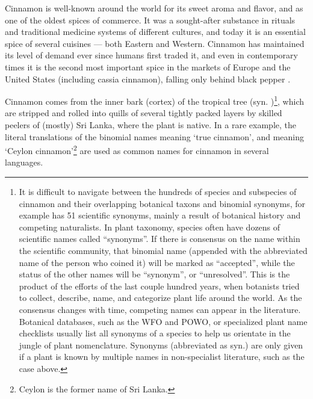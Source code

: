 \noindent Cinnamon is well-known around the world for its sweet aroma and flavor, and as one of the oldest spices of commerce. It was a sought-after substance in rituals and traditional medicine systems of different cultures, and today it is an essential spice of several cuisines --- both Eastern and Western. Cinnamon has maintained its level of demand ever since humans first traded it, and even in contemporary times it is the second most important spice in the markets of Europe and the United States (including cassia cinnamon), falling only behind black pepper \parencite[]{ravindran_cinnamon_2004}.

Cinnamon comes from the inner bark (cortex) of the tropical tree  (syn. )\footnote{It is difficult to navigate between the hundreds of species and subspecies of cinnamon and their overlapping botanical taxons and binomial synonyms,  for example has 51 scientific synonyms, mainly a result of botanical history and competing naturalists. In plant taxonomy, species often have dozens of scientific names called ``synonyms''. If there is consensus on the name within the scientific community, that binomial name (appended with the abbreviated name of the person who coined it) will be marked as ``accepted'', while the status of the other names will be ``synonym'', or ``unresolved''. This is the product of the efforts of the last couple hundred years, when botanists tried to collect, describe, name, and categorize plant life around the world. As the consensus changes with time, competing names can appear in the literature. Botanical databases, such as the \gls{WFO} and \gls{POWO}, or specialized plant name checklists usually list all synonyms of a species to help us orientate in the jungle of plant nomenclature. Synonyms (abbreviated as syn.) are only given if a plant is known by multiple names in non-specialist literature, such as the case above.}, which are stripped and rolled into quills of several tightly packed layers by skilled peelers of (mostly) Sri Lanka, where the plant is native. In a rare example, the literal translations of the binomial names  meaning `true cinnamon', and  meaning `Ceylon cinnamon'\footnote{Ceylon is the former name of Sri Lanka.} are used as common names for cinnamon in several languages. 



